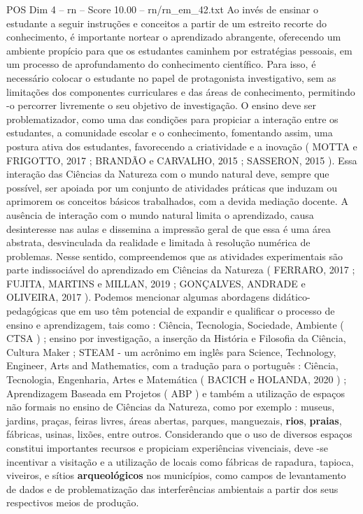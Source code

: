 \begin{textsample}{POS Dim 4 – rn – Score 10.00 – rn/rn\_em\_42.txt}
Ao invés de ensinar o estudante a seguir instruções e conceitos a partir de um estreito recorte do conhecimento, é importante nortear o aprendizado abrangente, oferecendo um ambiente propício para que os estudantes caminhem por estratégias pessoais, em um processo de aprofundamento do conhecimento científico.
Para isso, é necessário colocar o estudante no papel de protagonista investigativo, sem as limitações dos componentes curriculares e das áreas de conhecimento, permitindo -o percorrer livremente o seu objetivo de investigação.
O ensino deve ser problematizador, como uma das condições para propiciar a interação entre os estudantes, a comunidade escolar e o conhecimento, fomentando assim, uma postura ativa dos estudantes, favorecendo a criatividade e a inovação ( MOTTA e FRIGOTTO, 2017 ; BRANDÃO e CARVALHO, 2015 ; SASSERON, 2015 ).
Essa interação das Ciências da Natureza com o mundo natural deve, sempre que possível, ser apoiada por um conjunto de atividades práticas que induzam ou aprimorem os conceitos básicos trabalhados, com a devida mediação docente.
A ausência de interação com o mundo natural limita o aprendizado, causa desinteresse nas aulas e dissemina a impressão geral de que essa é uma área abstrata, desvinculada da realidade e limitada à resolução numérica de problemas.
Nesse sentido, compreendemos que as atividades experimentais são parte indissociável do aprendizado em Ciências da Natureza ( FERRARO, 2017 ; FUJITA, MARTINS e MILLAN, 2019 ; GONÇALVES, ANDRADE e OLIVEIRA, 2017 ).
Podemos mencionar algumas abordagens didático-pedagógicas que em uso têm potencial de expandir e qualificar o processo de ensino e aprendizagem, tais como : Ciência, Tecnologia, Sociedade, Ambiente ( CTSA ) ; ensino por investigação, a inserção da História e Filosofia da Ciência, Cultura Maker ; STEAM - um acrônimo em inglês para Science, Technology, Engineer, Arts and Mathematics, com a tradução para o português : Ciência, Tecnologia, Engenharia, Artes e Matemática ( BACICH e HOLANDA, 2020 ) ; Aprendizagem Baseada em Projetos ( ABP ) e também a utilização de espaços não formais no ensino de Ciências da Natureza, como por exemplo : museus, jardins, praças, feiras livres, áreas abertas, parques, manguezais, \textbf{rios}, \textbf{praias}, fábricas, usinas, lixões, entre outros.
Considerando que o uso de diversos espaços constitui importantes recursos e propiciam experiências vivenciais, deve -se incentivar a visitação e a utilização de locais como fábricas de rapadura, tapioca, viveiros, e sítios \textbf{arqueológicos} nos municípios, como campos de levantamento de dados e de problematização das interferências ambientais a partir dos seus respectivos meios de produção.

\end{textsample}
